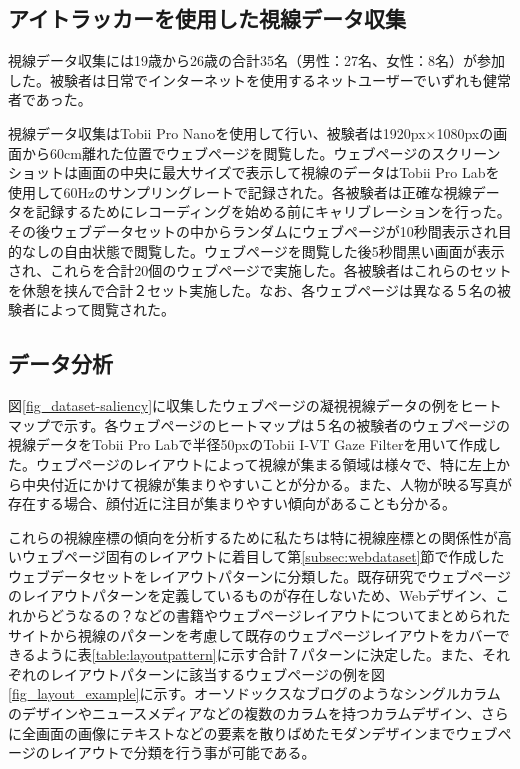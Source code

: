 \subsection{アイトラッカーを使用した視線データ収集}\label{subsec:gazedataset}
\par 視線データ収集には19歳から26歳の合計35名（男性：27名、女性：8名）が参加した。被験者は日常でインターネットを使用するネットユーザーでいずれも健常者であった。

\par 視線データ収集はTobii Pro Nano\cite{tobiipronano}を使用して行い、被験者は1920px×1080pxの画面から60cm離れた位置でウェブページを閲覧した。ウェブページのスクリーンショットは画面の中央に最大サイズで表示して視線のデータはTobii Pro Lab\cite{tobiiprolabo}を使用して60Hzのサンプリングレートで記録された。各被験者は正確な視線データを記録するためにレコーディングを始める前にキャリブレーションを行った。その後ウェブデータセットの中からランダムにウェブページが10秒間表示され目的なしの自由状態で閲覧した。ウェブページを閲覧した後5秒間黒い画面が表示され、これらを合計20個のウェブページで実施した。各被験者はこれらのセットを休憩を挟んで合計２セット実施した。なお、各ウェブページは異なる５名の被験者によって閲覧された。


\subsection{データ分析}
\par 図\ref{fig_dataset-saliency}に収集したウェブページの凝視視線データの例をヒートマップで示す。各ウェブページのヒートマップは５名の被験者のウェブページの視線データをTobii Pro Labで半径50pxのTobii I-VT Gaze Filterを用いて作成した。ウェブページのレイアウトによって視線が集まる領域は様々で、特に左上から中央付近にかけて視線が集まりやすいことが分かる。また、人物が映る写真が存在する場合、顔付近に注目が集まりやすい傾向があることも分かる。

\par これらの視線座標の傾向を分析するために私たちは特に視線座標との関係性が高いウェブページ固有のレイアウトに着目して第\ref{subsec:webdataset}節で作成したウェブデータセットをレイアウトパターンに分類した。既存研究でウェブページのレイアウトパターンを定義しているものが存在しないため、Webデザイン、これからどうなるの？\cite{bookwebdesign}などの書籍やウェブページレイアウトについてまとめられたサイトから視線のパターンを考慮して既存のウェブページレイアウトをカバーできるように表\ref{table:layoutpattern}に示す合計７パターンに決定した。また、それぞれのレイアウトパターンに該当するウェブページの例を図\ref{fig_layout_example}に示す。オーソドックスなブログのようなシングルカラムのデザインやニュースメディアなどの複数のカラムを持つカラムデザイン、さらに全画面の画像にテキストなどの要素を散りばめたモダンデザインまでウェブページのレイアウトで分類を行う事が可能である。

